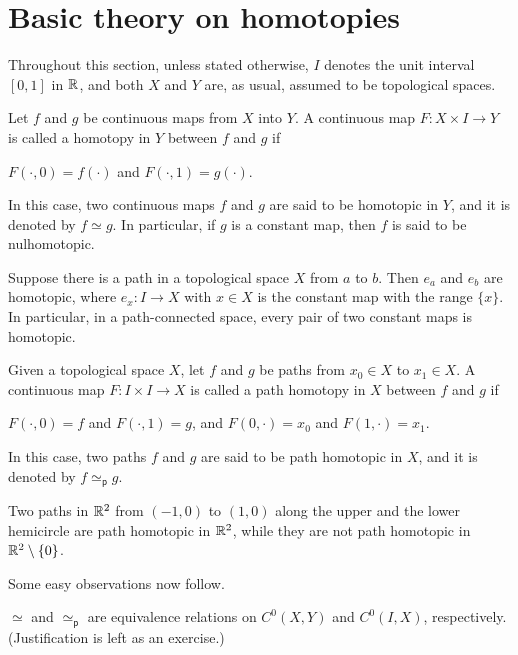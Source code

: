 \section{Basic theory on homotopies}

Throughout this section, unless stated otherwise, $I$ denotes the unit interval $[0, 1]$ in ${\mathbb{R}}$, and both $X$ and $Y$ are, as usual, assumed to be topological spaces.

\begin{defi}
    Let $f$ and $g$ be continuous maps from $X$ into $Y$.
    A continuous map $F: X\times I\rightarrow Y$ is called a homotopy in $Y$ between $f$ and $g$ if
    \begin{center}
        $F(\cdot, 0)=f(\cdot)$ and $F(\cdot, 1)=g(\cdot)$.
    \end{center}
    In this case, two continuous maps $f$ and $g$ are said to be homotopic in $Y$, and it is denoted by $f\simeq g$.
    In particular, if $g$ is a constant map, then $f$ is said to be nulhomotopic.
\end{defi}
\begin{exmp}
    Suppose there is a path in a topological space $X$ from $a$ to $b$.
    Then $e_a$ and $e_b$ are homotopic, where $e_x: I\rightarrow X$ with $x\in X$ is the constant map with the range $\{x\}$.
    In particular, in a path-connected space, every pair of two constant maps is homotopic.
\end{exmp}

\begin{defi}
    Given a topological space $X$, let $f$ and $g$ be paths from $x_0\in X$ to $x_1\in X$.
    A continuous map $F: I\times I\rightarrow X$ is called a path homotopy in $X$ between $f$ and $g$ if
    \begin{center}
        $F(\cdot, 0)=f$ and $F(\cdot, 1)=g$, and $F(0, \cdot)=x_0$ and $F(1, \cdot)=x_1$.
    \end{center}
    In this case, two paths $f$ and $g$ are said to be path homotopic in $X$, and it is denoted by $f\simeq_\textsf{p} g$.
\end{defi}

\begin{exmp}
    Two paths in ${\mathbb{R}}^2$ from $(-1, 0)$ to $(1, 0)$ along the upper and the lower hemicircle are path homotopic in ${\mathbb{R}}^2$, while they are not path homotopic in ${\mathbb{R}}^2\setminus\{0\}$.
\end{exmp}

Some easy observations now follow.
\begin{obs}\label{homotopy induces an equivalence relation}
    $\simeq$ and $\simeq_\textsf{p}$ are equivalence relations on $C^0(X, Y)$ and $C^0(I, X)$, respectively.
    \color{brown}(Justification is left as an exercise.)\color{black}
\end{obs}

